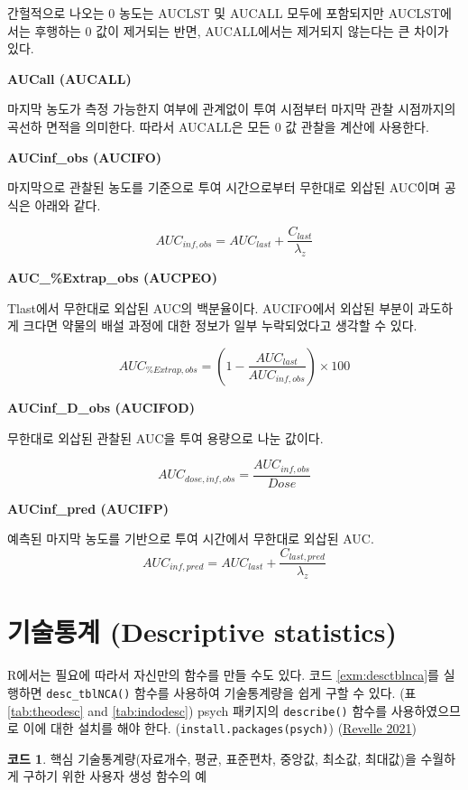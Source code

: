 \documentclass[
  11pt,
  krantz2, a4paper, twoside]{krantz}
\theoremstyle{definition}
\theoremstyle{definition}
\newtheorem{example}{코드}[chapter]
\theoremstyle{definition}
\theoremstyle{definition}
\theoremstyle{remark}
\begin{document}
간헐적으로 나오는 0 농도는 AUCLST 및 AUCALL 모두에 포함되지만 AUCLST에서는 후행하는 0 값이 제거되는 반면, AUCALL에서는 제거되지 않는다는 큰 차이가 있다.

\textbf{AUCall (AUCALL)}

마지막 농도가 측정 가능한지 여부에 관계없이 투여 시점부터 마지막 관찰 시점까지의 곡선하 면적을 의미한다. 따라서 AUCALL은 모든 0 값 관찰을 계산에 사용한다.

\textbf{AUCinf\_obs (AUCIFO)}

마지막으로 관찰된 농도를 기준으로 투여 시간으로부터 무한대로 외삽된 AUC이며 공식은 아래와 같다.

\[AUC_{inf,obs} = AUC_{last} + \frac{C_{last}}{\lambda_{z}}\]

\textbf{AUC\_\%Extrap\_obs (AUCPEO)}

Tlast에서 무한대로 외삽된 AUC의 백분율이다. AUCIFO에서 외삽된 부분이 과도하게 크다면 약물의 배설 과정에 대한 정보가 일부 누락되었다고 생각할 수 있다.

\[AUC_{\% Extrap,obs} = (1 - \frac{AUC_{last}}{AUC_{inf,obs}}) \times 100\]

\textbf{AUCinf\_D\_obs (AUCIFOD)}

무한대로 외삽된 관찰된 AUC을 투여 용량으로 나눈 값이다.

\[AUC_{dose,inf,obs} = \frac{AUC_{inf,obs}}{Dose}\]

\textbf{AUCinf\_pred (AUCIFP)}

예측된 마지막 농도를 기반으로 투여 시간에서 무한대로 외삽된 AUC.
\[AUC_{inf,pred} = AUC_{last} + \frac{C_{last,pred}}{\lambda_{z}}\]

\hypertarget{uxae30uxc220uxd1b5uxacc4-descriptive-statistics}{%
\section{기술통계 (Descriptive statistics)}\label{uxae30uxc220uxd1b5uxacc4-descriptive-statistics}}


R에서는 필요에 따라서 자신만의 함수를 만들 수도 있다.
코드 \ref{exm:desctblnca}를 실행하면 \texttt{desc\_tblNCA()} 함수를 사용하여 기술통계량을 쉽게 구할 수 있다. (표 \ref{tab:theodesc} and \ref{tab:indodesc})
psych 패키지의 \texttt{describe()} 함수를 사용하였으므로 이에 대한 설치를 해야 한다. (\texttt{install.packages(\textquotesingle{}psych\textquotesingle{})}) (\protect\hyperlink{ref-R-psych}{Revelle 2021})

\begin{example}
\protect\hypertarget{exm:desctblnca}{}{\label{exm:desctblnca} }핵심 기술통계량(자료개수, 평균, 표준편차, 중앙값, 최소값, 최대값)을 수월하게 구하기 위한 사용자 생성 함수의 예
\end{example}
\vspace{-5ex}
\end{document}
